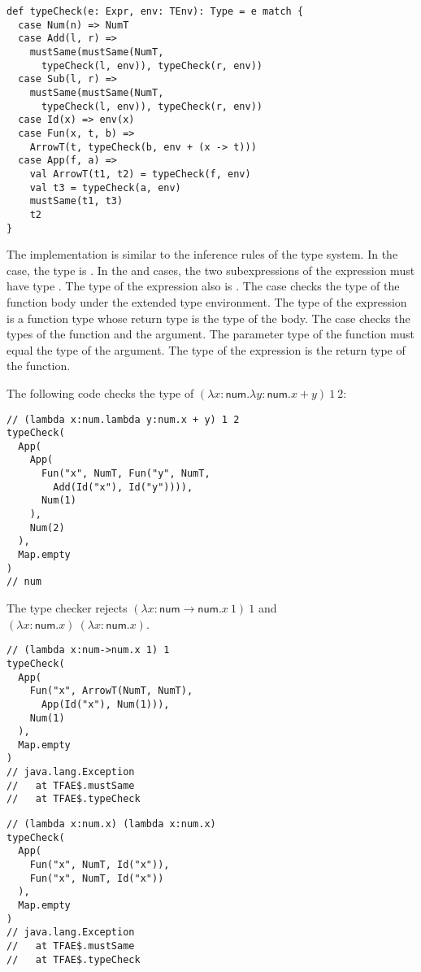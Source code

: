 \begin{verbatim}
def typeCheck(e: Expr, env: TEnv): Type = e match {
  case Num(n) => NumT
  case Add(l, r) =>
    mustSame(mustSame(NumT,
      typeCheck(l, env)), typeCheck(r, env))
  case Sub(l, r) =>
    mustSame(mustSame(NumT,
      typeCheck(l, env)), typeCheck(r, env))
  case Id(x) => env(x)
  case Fun(x, t, b) =>
    ArrowT(t, typeCheck(b, env + (x -> t)))
  case App(f, a) =>
    val ArrowT(t1, t2) = typeCheck(f, env)
    val t3 = typeCheck(a, env)
    mustSame(t1, t3)
    t2
}
\end{verbatim}

The implementation is similar to the inference rules of the type system. In the
 case, the type is . In the  and  cases,
the two subexpressions of the expression must have type . The type of
the expression also is . The  case checks the type of the
function body under the extended type environment. The type of the expression is
a function type whose return type is the type of the body. The  case
checks the types of the function and the argument. The parameter type of the
function must equal the type of the argument. The type of the expression is the
return type of the function.

The following code checks the type of $(\lambda x:\textsf{num}.\lambda
y:\textsf{num}.x+y)\ 1\ 2$:

\begin{verbatim}
// (lambda x:num.lambda y:num.x + y) 1 2
typeCheck(
  App(
    App(
      Fun("x", NumT, Fun("y", NumT,
        Add(Id("x"), Id("y")))),
      Num(1)
    ),
    Num(2)
  ),
  Map.empty
)
// num
\end{verbatim}

The type checker rejects $(\lambda x:\textsf{num}\rightarrow\textsf{num}.x\ 1)\
1$ and $(\lambda x:\textsf{num}.x)\ (\lambda x:\textsf{num}.x)$.

\begin{verbatim}
// (lambda x:num->num.x 1) 1
typeCheck(
  App(
    Fun("x", ArrowT(NumT, NumT),
      App(Id("x"), Num(1))),
    Num(1)
  ),
  Map.empty
)
// java.lang.Exception
//   at TFAE$.mustSame
//   at TFAE$.typeCheck
\end{verbatim}

\begin{verbatim}
// (lambda x:num.x) (lambda x:num.x)
typeCheck(
  App(
    Fun("x", NumT, Id("x")),
    Fun("x", NumT, Id("x"))
  ),
  Map.empty
)
// java.lang.Exception
//   at TFAE$.mustSame
//   at TFAE$.typeCheck
\end{verbatim}

